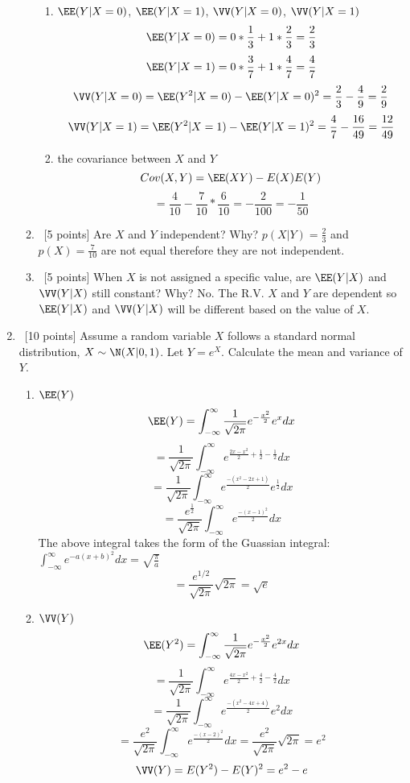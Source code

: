 \documentclass[12pt, fullpage,letterpaper]{article}
\begin{document}
\begin{enumerate}
\begin{enumerate}
\begin{enumerate}
            \item  $\EE(Y|X=0)$, $\EE(Y|X=1)$,  $\VV(Y|X=0)$, $\VV(Y|X=1)$ 
            \[\EE(Y|X = 0) = 0 * \frac{1}{3} + 1 * \frac{2}{3} = \frac{2}{3}\]\newline
            \[\EE(Y|X = 1) = 0 * \frac{3}{7} + 1 * \frac{4}{7} = \frac{4}{7}\]\newline
            \[\VV(Y|X = 0) = \EE(Y^2|X = 0) - \EE(Y|X = 0)^2 = \frac{2}{3} - \frac{4}{9} = \frac{2}{9}\]\newline
            \[\VV(Y|X = 1) = \EE(Y^2|X = 1) - \EE(Y|X = 1)^2 = \frac{4}{7} - \frac{16}{49} = \frac{12}{49}\]\newline
            \item  the covariance between $X$ and $Y$
            \[Cov(X, Y) = \EE(XY) - E(X)E(Y)\]\newline
            \[= \frac{4}{10} - \frac{7}{10} * \frac{6}{10} = -\frac{2}{100} = -\frac{1}{50}\]
            \end{enumerate}
            \item~[5 points] Are $X$ and $Y$ independent? Why?\newline
            $p(X|Y) = \frac{2}{3}$ and $p(X) = \frac{7}{10}$ are not equal therefore they are not independent.
            \item~[5 points] When $X$ is not assigned a specific value, are $\EE(Y|X)$ and $\VV(Y|X)$ still constant? Why?\newline
            No.  The R.V. $X$ and $Y$ are dependent so $\EE(Y|X)$ and $\VV(Y|X)$ will be different based on the value of $X$.
        \end{enumerate}
\item~[10 points] Assume a random variable $X$ follows a standard normal distribution, \ie $X \sim \N(X|0, 1)$. Let $Y = e^X$. Calculate the mean and variance of $Y$.
\begin{enumerate}
	\item $\EE(Y)$ \newline
	\[\EE(Y) = \int_{-\infty}^{\infty}\frac{1}{\sqrt{2\pi}}e^{-\frac{x^2}{2}}e^xdx\]
	\[=\frac{1}{\sqrt{2\pi}}\int_{-\infty}^{\infty}e^{\frac{2x-x^2}{2}+\frac{1}{2}-\frac{1}{2}}dx\]
	\[=\frac{1}{\sqrt{2\pi}}\int_{-\infty}^{\infty}e^{\frac{-(x^2-2x+1)}{2}}e^{\frac{1}{2}}dx\]
	\[=\frac{e^{\frac{1}{2}}}{\sqrt{2\pi}}\int_{-\infty}^{\infty}e^{\frac{-(x-1)^2}{2}}dx\]
	The above integral takes the form of the Guassian integral: $\int_{-\infty}^{\infty}e^{-a(x+b)^2}dx = \sqrt{\frac{\pi}{a}}$
	\[=\frac{e^{1/2}}{\sqrt{2\pi}}\sqrt{2\pi} = \sqrt{e}\]
	\item $\VV(Y)$
	\[\EE(Y^2) = \int_{-\infty}^{\infty}\frac{1}{\sqrt{2\pi}}e^{-\frac{x^2}{2}}e^{2x}dx\]
	\[=\frac{1}{\sqrt{2\pi}}\int_{-\infty}^{\infty}e^{\frac{4x-x^2}{2}+\frac{4}{2}-\frac{4}{2}}dx\]
	\[=\frac{1}{\sqrt{2\pi}}\int_{-\infty}^{\infty}e^{\frac{-(x^2-4x+4)}{2}}e^2dx\]
	\[=\frac{e^2}{\sqrt{2\pi}}\int_{-\infty}^{\infty}e^{\frac{-(x-2)^2}{2}}dx = \frac{e^2}{\sqrt{2\pi}}\sqrt{2\pi} = e^2\]
	\[\VV(Y) = E(Y^2) - E(Y)^2 = e^2 - e\]
\end{enumerate}


\end{enumerate}
\end{document}
